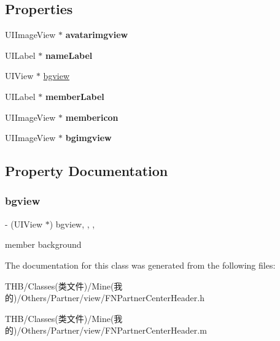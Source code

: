 \subsection*{Properties}
\begin{DoxyCompactItemize}
\item 
\mbox{\label{interface_f_n_partner_center_header_ae374c6e288d4c241f4982e1cb1c1c657}} 
U\+I\+Image\+View $\ast$ {\bfseries avatarimgview}
\item 
\mbox{\label{interface_f_n_partner_center_header_a214bf346000184dd601300f52ff3dd2b}} 
U\+I\+Label $\ast$ {\bfseries name\+Label}
\item 
U\+I\+View $\ast$ \mbox{\hyperlink{interface_f_n_partner_center_header_a8edbef889a3a2b07fcf4903342343d23}{bgview}}
\item 
\mbox{\label{interface_f_n_partner_center_header_a5b29ca7f3f6c67ef5077f784a9fe48b0}} 
U\+I\+Label $\ast$ {\bfseries member\+Label}
\item 
\mbox{\label{interface_f_n_partner_center_header_a33267294e3f259579d5b6b7b12d9ce06}} 
U\+I\+Image\+View $\ast$ {\bfseries membericon}
\item 
\mbox{\label{interface_f_n_partner_center_header_aa4f6ee99b5d179001a718f0ea4af836b}} 
U\+I\+Image\+View $\ast$ {\bfseries bgimgview}
\end{DoxyCompactItemize}


\subsection{Property Documentation}
\mbox{\label{interface_f_n_partner_center_header_a8edbef889a3a2b07fcf4903342343d23}} 
\subsubsection{\texorpdfstring{bgview}{bgview}}
{\footnotesize\ttfamily -\/ (U\+I\+View $\ast$) bgview\hspace{0.3cm}{\ttfamily [read]}, {\ttfamily [write]}, {\ttfamily [nonatomic]}, {\ttfamily [strong]}}

member background 

The documentation for this class was generated from the following files\+:\begin{DoxyCompactItemize}
\item 
T\+H\+B/\+Classes(类文件)/\+Mine(我的)/\+Others/\+Partner/view/F\+N\+Partner\+Center\+Header.\+h\item 
T\+H\+B/\+Classes(类文件)/\+Mine(我的)/\+Others/\+Partner/view/F\+N\+Partner\+Center\+Header.\+m\end{DoxyCompactItemize}
